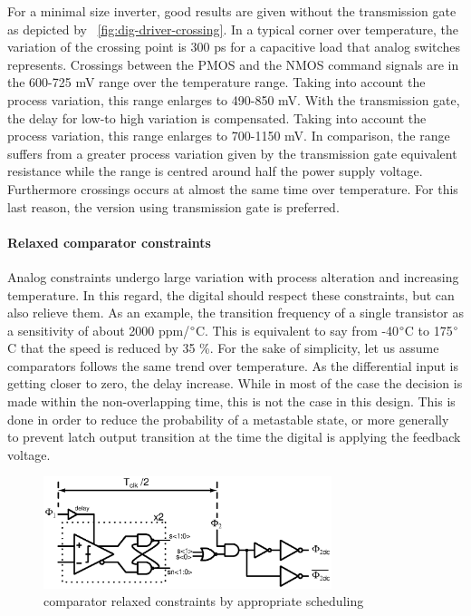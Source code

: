 For a minimal size inverter, good results are given without the transmission gate as depicted by \figurename~\ref{fig:dig-driver-crossing}. In a typical corner over temperature, the variation of the crossing point is 300 ps for a capacitive load that analog switches represents. Crossings between the PMOS and the NMOS command signals are in the 600-725 mV range over the temperature range. Taking into account the process variation, this range enlarges to 490-850 mV. With the transmission gate, the delay for low-to high variation is compensated. Taking into account the process variation, this range enlarges to 700-1150 mV. In comparison, the range suffers from a greater process variation given by the transmission gate equivalent resistance while the range is centred around half the power supply voltage. Furthermore crossings occurs at almost the same time over temperature. For this last reason, the version using transmission gate is preferred.
\paragraph{Relaxed comparator constraints}

Analog constraints undergo large variation with process alteration and increasing temperature. In this regard, the digital should respect these constraints, but can also relieve them. As an example, the transition frequency of a single transistor as a sensitivity of about 2000 ppm/\(\degree \)C. This is equivalent to say from -40\(\degree \)C to 175\(\degree \)C that the speed is reduced by 35 \%. For the sake of simplicity, let us assume comparators follows the same trend over temperature. As the differential input is getting closer to zero, the delay increase. While in most of the case the decision is made within the non-overlapping time, this is not the case in this design. This is done in order to reduce the probability of a metastable state, or more generally to prevent latch output transition at the time the digital is applying the feedback voltage.
\begin{figure}[htp]
	\centering
	\includegraphics[width=0.75\textwidth]{Chapter4/Figs/comp-timing-isd.ps}
	\caption{comparator relaxed constraints by appropriate scheduling}
	\label{fig:comp-timing}
\end{figure}

